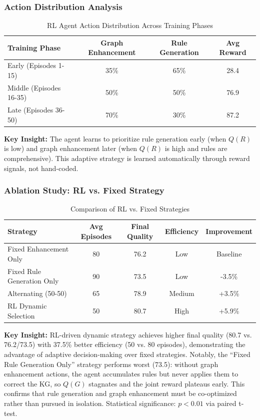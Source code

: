 \documentclass[runningheads]{llncs}
\begin{document}
\subsubsection{Action Distribution Analysis}

\begin{table}[H]
    \centering
    \caption{RL Agent Action Distribution Across Training Phases}
    \label{tab:action_distribution}
    \begin{tabular}{l c c c}
    \toprule
    Training Phase & Graph Enhancement & Rule Generation & Avg Reward \\
    \midrule
    Early (Episodes 1-15) & 35\% & 65\% & 28.4 \\
    Middle (Episodes 16-35) & 50\% & 50\% & 76.9 \\
    Late (Episodes 36-50) & 70\% & 30\% & 87.2 \\
    \bottomrule
    \end{tabular}
\end{table}

\textbf{Key Insight:} The agent learns to prioritize rule generation early (when $Q(R)$ is low) and graph enhancement later (when $Q(R)$ is high and rules are comprehensive). This adaptive strategy is learned automatically through reward signals, not hand-coded.

\subsubsection{Ablation Study: RL vs. Fixed Strategy}
\begin{table}[H]
    \centering
    \caption{Comparison of RL vs. Fixed Strategies}
    \label{tab:rl_ablation}
    \begin{tabular}{l c c c c}
    \toprule
    Strategy & Avg Episodes & Final Quality & Efficiency & Improvement \\
    \midrule
    Fixed Enhancement Only & 80 & 76.2 & Low & Baseline \\
    Fixed Rule Generation Only & 90 & 73.5 & Low & -3.5\% \\
    Alternating (50-50) & 65 & 78.9 & Medium & +3.5\% \\
    RL Dynamic Selection & 50 & 80.7 & High & +5.9\% \\
    \bottomrule
    \end{tabular}
\end{table}

\textbf{Key Insight:} RL-driven dynamic strategy achieves higher final quality (80.7 vs. 76.2/73.5) with 37.5\% better efficiency (50 vs. 80 episodes), demonstrating the advantage of adaptive decision-making over fixed strategies. Notably, the ``Fixed Rule Generation Only'' strategy performs worst (73.5): without graph enhancement actions, the agent accumulates rules but never applies them to correct the KG, so $Q(G)$ stagnates and the joint reward plateaus early. This confirms that rule generation and graph enhancement must be co-optimized rather than pursued in isolation. Statistical significance: $p < 0.01$ via paired t-test.
\end{document}
